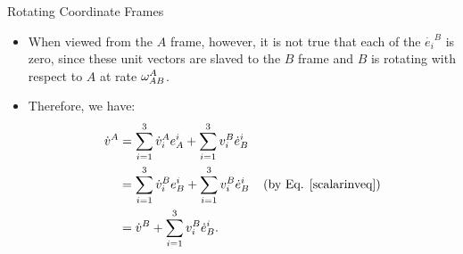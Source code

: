 \begin{frame}
Rotating Coordinate Frames
\begin{itemize}
\item When viewed from the $A$ frame, however, it is not true that each
of the $\dot{e_i}^B$ is zero, since these unit vectors are slaved
to the $B$ frame and $B$ is rotating with respect to $A$ at rate
$\omega_{AB}^A$.  
\item Therefore, we have:
\begin{equation}\label{aderiv}
\begin{split}
\dot{v}^A&=\sum_{i=1}^3 \dot{v}_i^A e_A^i + \sum_{i=1}^3 v_i^B
\dot{e}_B^i\\
         &=\sum_{i=1}^3 \dot{v}_i^B e_B^i + \sum_{i=1}^3 v_i^B
\dot{e}_B^i \text{\;\;\;\;(by Eq. \eqref{scalarinveq})}\\
         &=\dot{v}^B +\sum_{i=1}^3 v_i^B\dot{e}_B^i.
\end{split}
\end{equation}
\end{itemize}
\end{frame}

